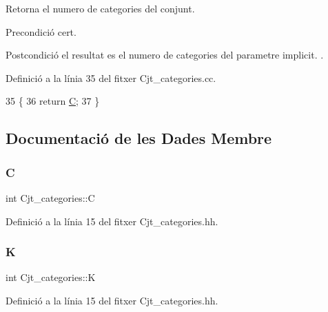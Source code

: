 Retorna el numero de categories del conjunt. 

\begin{DoxyPrecond}{Precondició}
cert. 
\end{DoxyPrecond}
\begin{DoxyPostcond}{Postcondició}
el resultat es el numero de categories del parametre implicit. . 
\end{DoxyPostcond}


Definició a la línia 35 del fitxer Cjt\+\_\+categories.\+cc.


\begin{DoxyCode}
35                                    \{
36     \textcolor{keywordflow}{return} \mbox{\hyperlink{class_cjt__categories_a1d3d6eb2bd5a981ca1e56d4d16e7d1c1}{C}};
37 \}
\end{DoxyCode}


\subsection{Documentació de les Dades Membre}
\mbox{\label{class_cjt__categories_a1d3d6eb2bd5a981ca1e56d4d16e7d1c1}} 
\subsubsection{\texorpdfstring{C}{C}}
{\footnotesize\ttfamily int Cjt\+\_\+categories\+::C\hspace{0.3cm}{\ttfamily [private]}}



Definició a la línia 15 del fitxer Cjt\+\_\+categories.\+hh.

\mbox{\label{class_cjt__categories_a3e7981c4f9b0aa3e0d5999ffa291ce54}} 
\subsubsection{\texorpdfstring{K}{K}}
{\footnotesize\ttfamily int Cjt\+\_\+categories\+::K\hspace{0.3cm}{\ttfamily [private]}}



Definició a la línia 15 del fitxer Cjt\+\_\+categories.\+hh.

